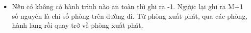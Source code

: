 \begin{itemize}
	\item Nếu có không có hành trình nào an toàn thì ghi ra -1. Ngược lại ghi ra M+1 số nguyên là chỉ số phòng trên đường đi. Từ phòng xuất phát, qua các phòng, hành lang rồi quay trở về phòng xuất phát.
\end{itemize}
